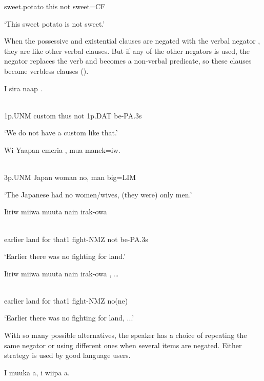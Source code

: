 sweet.potato  this  not  sweet=CF

`This sweet potato is not sweet.'

When the possessive and existential clauses are negated with the verbal negator , they are like other verbal clauses. But if any of the other negators is used, the negator replaces the verb and becomes a non-verbal predicate, so these clauses become verbless clauses ().

\ea%
\label{ex:x1098}
\gll I  sira  naap    . \\
      \\
\glt
\z

1p.UNM  custom  thus  not  1p.DAT  be-PA.3s

`We do not have a custom like that.'

\ea%
\label{ex:x1094}
\gll Wi  Yaapan  emeria  ,  mua  manek=iw. \\
      \\
\glt
\z

3p.UNM  Japan  woman  no,  man  big=LIM

`The Japanese had no women/wives, (they were) only men.'

\ea%
\label{ex:x1099}
\gll Iiriw  miiwa  muuta  nain  irak-owa   \\
      \\
\glt
\z

earlier  land  for  that1  fight-NMZ  not  be-PA.3s

`Earlier there was no fighting for land.'

\ea%
\label{ex:x1100}
\gll Iiriw  miiwa  muuta  nain  irak-owa  , {\dots} \\
      \\
\glt
\z

earlier  land  for  that1  fight-NMZ  no(ne)

`Earlier there was no fighting for land, ...'

With so many possible alternatives, the speaker has a choice of repeating the same negator or using different ones when several items are negated. Either strategy is used by good language users.

\ea%
\label{ex:x1128}
\gll I  muuka    a,  i  wiipa    a. \\
      \\
\glt
\z

